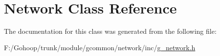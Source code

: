 \hypertarget{class_network}{\section{Network Class Reference}
\label{class_network}
}


The documentation for this class was generated from the following file\-:\begin{DoxyCompactItemize}
\item 
F\-:/\-Gohoop/trunk/module/gcommon/network/inc/\hyperlink{g__network_8h}{g\-\_\-network.\-h}\end{DoxyCompactItemize}
